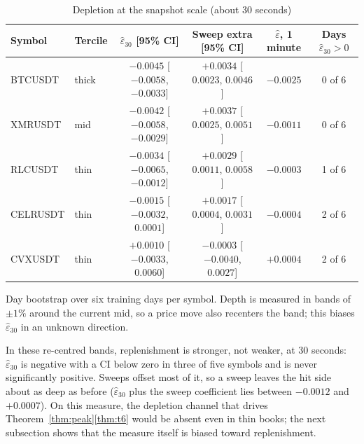 \begin{table}[t]\centering\small
\begin{threeparttable}
\caption{Depletion at the snapshot scale (about 30 seconds)}\label{tab:x8}
\setlength{\tabcolsep}{2.5pt}
\begin{tabular}{llcccc}
\toprule
Symbol & Tercile & $\hat\varepsilon_{30}$ [95\% CI] & Sweep extra [95\% CI] & $\hat\varepsilon$, 1 minute & Days $\hat\varepsilon_{30}>0$\\
\midrule
BTCUSDT & thick & $-0.0045$ [$-0.0058$, $-0.0033$] & $+0.0034$ [$0.0023$, $0.0046$] & $-0.0025$ & 0 of 6\\
XMRUSDT & mid & $-0.0042$ [$-0.0058$, $-0.0029$] & $+0.0037$ [$0.0025$, $0.0051$] & $-0.0011$ & 0 of 6\\
RLCUSDT & thin & $-0.0034$ [$-0.0065$, $-0.0012$] & $+0.0029$ [$0.0011$, $0.0058$] & $-0.0003$ & 1 of 6\\
CELRUSDT & thin & $-0.0015$ [$-0.0032$, $0.0001$] & $+0.0017$ [$0.0004$, $0.0031$] & $-0.0004$ & 2 of 6\\
CVXUSDT & thin & $+0.0010$ [$-0.0033$, $0.0060$] & $-0.0003$ [$-0.0040$, $0.0027$] & $+0.0004$ & 2 of 6\\
\bottomrule
\end{tabular}
\begin{tablenotes}\footnotesize\item Day bootstrap over six training days per symbol. Depth is measured in bands of $\pm1\%$ around the current mid, so a price move also recenters the band; this biases $\hat\varepsilon_{30}$ in an unknown direction. \end{tablenotes}
\end{threeparttable}
\end{table}

In these re-centred bands, replenishment is stronger, not weaker, at 30 seconds: $\hat\varepsilon_{30}$ is negative with a CI below zero in three of five symbols and is never significantly positive. Sweeps offset most of it, so a sweep leaves the hit side about as deep as before ($\hat\varepsilon_{30}$ plus the sweep coefficient lies between $-0.0012$ and $+0.0007$). On this measure, the depletion channel that drives Theorem~\ref{thm:peak}\ref{thm:t6} would be absent even in thin books; the next subsection shows that the measure itself is biased toward replenishment.

